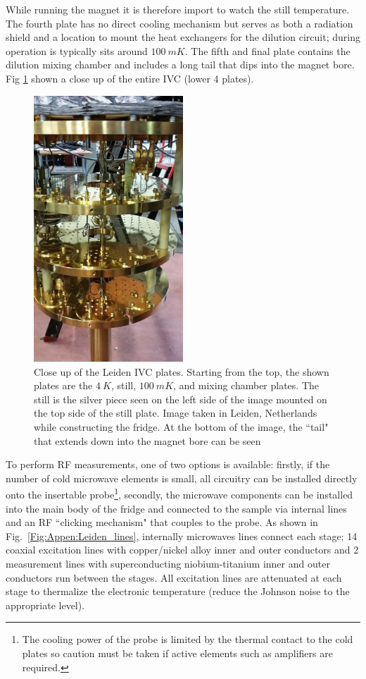  While running the magnet it is therefore import to watch the still temperature. The fourth plate has no direct cooling mechanism but serves as both a radiation shield and a location to mount the heat exchangers for the dilution circuit; during operation is typically sits around $100~mK$. The fifth and final plate contains the dilution mixing chamber and includes a long tail that dips into the magnet bore. Fig \ref{Fig:Appen:Leiden_Full} shown a close up of the entire IVC (lower 4 plates).

\begin{figure}
\centering
\includegraphics[width = 0.5\textwidth]{figures/appendix/cryostats/Leiden_full.jpg}
\caption{Close up of the Leiden IVC plates. Starting from the top, the shown plates are the $4~K$, still, $100~mK$, and mixing chamber plates. The still is the silver piece seen on the left side of the image mounted on the top side of the still plate. Image taken in Leiden, Netherlands while constructing the fridge. At the bottom of the image, the ``tail" that extends down into the magnet bore can be seen}
\label{Fig:Appen:Leiden_Full}
\end{figure}

To perform RF measurements, one of two options is available: firstly, if the number of cold microwave elements is small, all circuitry can be installed directly onto the insertable probe\footnote{The cooling power of the probe is limited by the thermal contact to the cold plates so caution must be taken if active elements such as amplifiers are required.}, secondly, the microwave components can be installed into the main body of the fridge and connected to the sample via internal lines and an RF ``clicking mechanism" that couples to the probe. As shown in Fig.~\ref{Fig:Appen:Leiden_lines}, internally microwaves lines connect each stage; 14 coaxial excitation lines with copper/nickel alloy inner and outer conductors and 2 measurement lines with superconducting niobium-titanium inner and outer conductors run between the stages. All excitation lines are attenuated at each stage to thermalize the electronic temperature (reduce the Johnson noise to the appropriate level).

